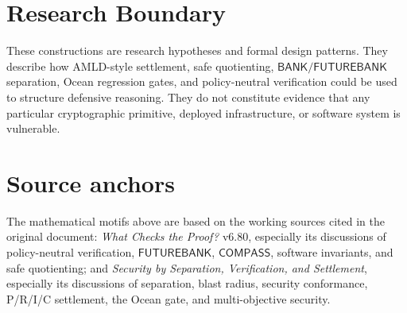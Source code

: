 \documentclass[11pt]{article}
\newcommand{\BANK}{\mathsf{BANK}}
\newcommand{\FB}{\mathsf{FUTUREBANK}}
\newcommand{\COMPASS}{\mathsf{COMPASS}}
\begin{document}
\section*{Research Boundary}
These constructions are research hypotheses and formal design patterns. They describe how AMLD-style
settlement, safe quotienting, \(\BANK/\FB\) separation, Ocean regression gates, and policy-neutral
verification could be used to structure defensive reasoning. They do not constitute evidence that any
particular cryptographic primitive, deployed infrastructure, or software system is vulnerable.

\section*{Source anchors}
The mathematical motifs above are based on the working sources cited in the original document:
\emph{What Checks the Proof?} v6.80, especially its discussions of policy-neutral verification,
\(\FB\), \(\COMPASS\), software invariants, and safe quotienting; and
\emph{Security by Separation, Verification, and Settlement}, especially its discussions of
separation, blast radius, security conformance, P/R/I/C settlement, the Ocean gate, and
multi-objective security.
\end{document}
